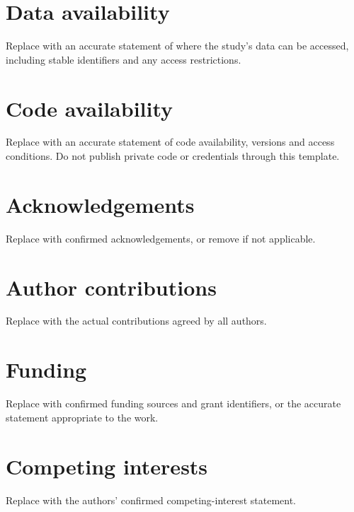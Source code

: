 \documentclass[pdflatex,sn-nature]{sn-jnl}
\begin{document}
\section*{Data availability}
Replace with an accurate statement of where the study's data can be accessed,
including stable identifiers and any access restrictions.

\section*{Code availability}
Replace with an accurate statement of code availability, versions and access
conditions. Do not publish private code or credentials through this template.

\section*{Acknowledgements}
Replace with confirmed acknowledgements, or remove if not applicable.

\section*{Author contributions}
Replace with the actual contributions agreed by all authors.

\section*{Funding}
Replace with confirmed funding sources and grant identifiers, or the accurate
statement appropriate to the work.

\section*{Competing interests}
Replace with the authors' confirmed competing-interest statement.


\end{document}
